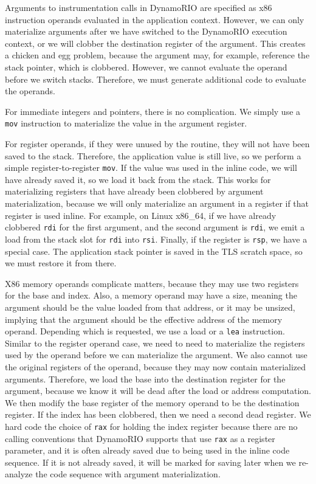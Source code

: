 Arguments to instrumentation calls in DynamoRIO are specified as x86 instruction
operands evaluated in the application context.  However, we can only materialize
arguments after we have switched to the DynamoRIO execution context, or we will
clobber the destination register of the argument.  This creates a chicken and
egg problem, because the argument may, for example, reference the stack pointer,
which is clobbered.  However, we cannot evaluate the operand before we switch
stacks.  Therefore, we must generate additional code to evaluate the operands.

For immediate integers and pointers, there is no complication.  We simply use a
{\tt mov} instruction to materialize the value in the argument register.

For register operands, if they were unused by the routine, they will not have
been saved to the stack.  Therefore, the application value is still live, so we
perform a simple register-to-register {\tt mov}.  If the value was used in the
inline code, we will have already saved it, so we load it back from the stack.
This works for materializing registers that have already been clobbered by
argument materialization, because we will only materialize an argument in a
register if that register is used inline.  For example, on Linux x86\_64, if we
have already clobbered {\tt rdi} for the first argument, and the second argument
is {\tt rdi}, we emit a load from the stack slot for {\tt rdi} into {\tt rsi}.
Finally, if the register is {\tt rsp}, we have a special case.  The application
stack pointer is saved in the TLS scratch space, so we must restore it from
there.

X86 memory operands complicate matters, because they may use two registers for
the base and index.  Also, a memory operand may have a size, meaning the
argument should be the value loaded from that address, or it may be unsized,
implying that the argument should be the effective address of the memory
operand.  Depending which is requested, we use a load or a {\tt lea}
instruction.  Similar to the register operand case, we need to need to
materialize the registers used by the operand before we can materialize the
argument.  We also cannot use the original registers of the operand, because
they may now contain materialized arguments.  Therefore, we load the base into
the destination register for the argument, because we know it will be dead after
the load or address computation.  We then modify the base register of the memory
operand to be the destination register.  If the index has been clobbered, then
we need a second dead register.  We hard code the choice of {\tt rax} for
holding the index register because there are no calling conventions that
DynamoRIO supports that use {\tt rax} as a register parameter, and it is often
already saved due to being used in the inline code sequence.  If it is not
already saved, it will be marked for saving later when we re-analyze the code
sequence with argument materialization.

